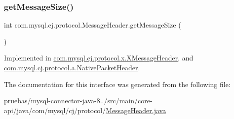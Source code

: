\subsubsection{\texorpdfstring{get\+Message\+Size()}{getMessageSize()}}
{\footnotesize\ttfamily int com.\+mysql.\+cj.\+protocol.\+Message\+Header.\+get\+Message\+Size (\begin{DoxyParamCaption}{ }\end{DoxyParamCaption})}



Implemented in \mbox{\hyperlink{classcom_1_1mysql_1_1cj_1_1protocol_1_1x_1_1_x_message_header_a7a585e24fbcd4364793244041eb81dcd}{com.\+mysql.\+cj.\+protocol.\+x.\+X\+Message\+Header}}, and \mbox{\hyperlink{classcom_1_1mysql_1_1cj_1_1protocol_1_1a_1_1_native_packet_header_a334336fd736a087bae40bfbb288e27e4}{com.\+mysql.\+cj.\+protocol.\+a.\+Native\+Packet\+Header}}.



The documentation for this interface was generated from the following file\+:\begin{DoxyCompactItemize}
\item 
pruebas/mysql-\/connector-\/java-\/8../src/main/core-\/api/java/com/mysql/cj/protocol/\mbox{\hyperlink{_message_header_8java}{Message\+Header.\+java}}\end{DoxyCompactItemize}
